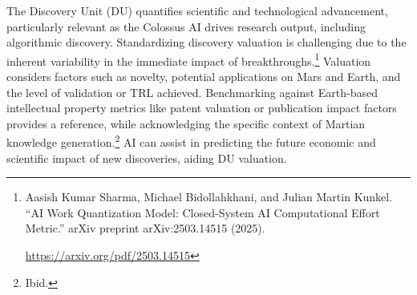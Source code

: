 \documentclass[fontsize=10pt, oneside, DIV=calc]{scrartcl}
\begin{document}
\medskip

\noindent
The Discovery Unit (DU) quantifies scientific and technological advancement, particularly relevant as the Colossus AI drives research output, including algorithmic discovery. Standardizing discovery valuation is challenging due to the inherent variability in the immediate impact of breakthroughs.\footnote{Aasish Kumar Sharma, Michael Bidollahkhani, and Julian Martin Kunkel. ``AI Work Quantization Model: Closed-System AI Computational Effort Metric.'' arXiv preprint arXiv:2503.14515 (2025). 











\href{https://arxiv.org/pdf/2503.14515}\url{https://arxiv.org/pdf/2503.14515}} Valuation considers factors such as novelty, potential applications on Mars and Earth, and the level of validation or TRL achieved. Benchmarking against Earth-based intellectual property metrics like patent valuation or publication impact factors provides a reference, while acknowledging the specific context of Martian knowledge generation.\footnote{Ibid.} AI can assist in predicting the future economic and scientific impact of new discoveries, aiding DU valuation.

\medskip
\end{document}
